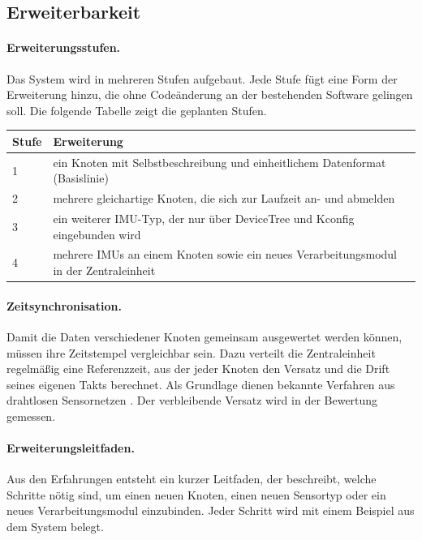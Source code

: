 \documentclass[11pt, a4paper]{article}
\begin{document}
\subsection{Erweiterbarkeit}

\paragraph{Erweiterungsstufen.} Das System wird in mehreren Stufen aufgebaut. Jede Stufe fügt eine Form der Erweiterung hinzu, die ohne Codeänderung an der bestehenden Software gelingen soll. Die folgende Tabelle zeigt die geplanten Stufen.

\begin{center}
\small
\begin{tabularx}{\textwidth}{@{}l X@{}}
\toprule
\textbf{Stufe} & \textbf{Erweiterung} \\
\midrule
1 & ein Knoten mit Selbstbeschreibung und einheitlichem Datenformat (Basislinie) \\
2 & mehrere gleichartige Knoten, die sich zur Laufzeit an- und abmelden \\
3 & ein weiterer IMU-Typ, der nur über DeviceTree und Kconfig eingebunden wird \\
4 & mehrere IMUs an einem Knoten sowie ein neues Verarbeitungsmodul in der Zentraleinheit \\
\bottomrule
\end{tabularx}
\end{center}

\paragraph{Zeitsynchronisation.} Damit die Daten verschiedener Knoten gemeinsam ausgewertet werden können, müssen ihre Zeitstempel vergleichbar sein. Dazu verteilt die Zentraleinheit regelmäßig eine Referenzzeit, aus der jeder Knoten den Versatz und die Drift seines eigenen Takts berechnet. Als Grundlage dienen bekannte Verfahren aus drahtlosen Sensornetzen \cite{elson2002rbs,maroti2004ftsp}. Der verbleibende Versatz wird in der Bewertung gemessen.

\paragraph{Erweiterungsleitfaden.} Aus den Erfahrungen entsteht ein kurzer Leitfaden, der beschreibt, welche Schritte nötig sind, um einen neuen Knoten, einen neuen Sensortyp oder ein neues Verarbeitungsmodul einzubinden. Jeder Schritt wird mit einem Beispiel aus dem System belegt.
\end{document}
